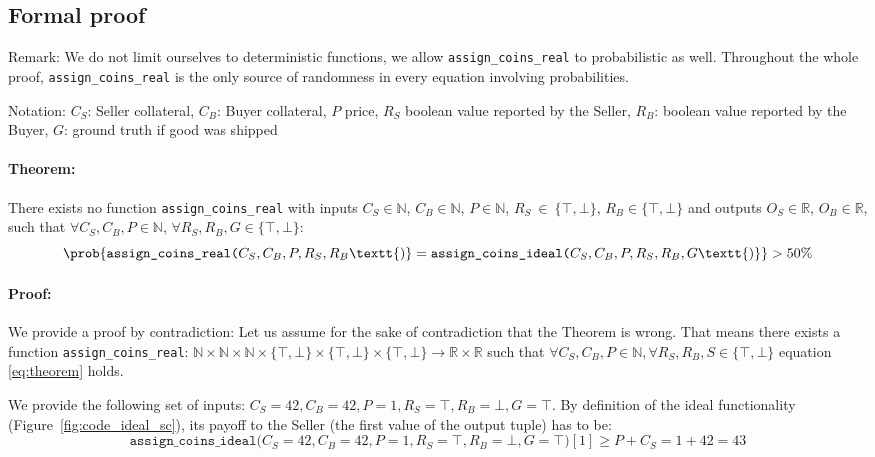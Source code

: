 \documentclass{cacthesis}
\newcommand{\authnote}[3]{{ \footnotesize \textbf{#1[#2: #3]~}}}
\newcommand{\niknote}[1]{\authnote{\color{red}}{Nikos}{#1}}
\begin{document}
\subsection{Formal proof}
Remark: We do not limit ourselves to deterministic functions, we allow \texttt{assign\_coins\_real} to probabilistic as well. Throughout the whole proof, \texttt{assign\_coins\_real} is the only source of randomness in every equation involving probabilities.\newline

Notation: $C_S$: Seller collateral, $C_B$: Buyer collateral, $P$ price, $R_S$ boolean value reported by the Seller, $R_B$: boolean value reported by the Buyer, $G$: ground truth if good was shipped

\paragraph{Theorem:}There exists no function \texttt{assign\_coins\_real} with inputs $C_S \in \mathbb{N}$, $C_B \in \mathbb{N}$, $P \in \mathbb{N}$, $R_S~\in~\{\top,\bot\}$, $R_B \in \{\top,\bot\}$ and outputs  $O_S \in \mathbb{R}$, $O_B \in \mathbb{R}$, such that
 $\forall C_S, C_B, P\in \mathbb{N}$, $\forall R_S,R_B,G \in \{\top,\bot\}$:
\begin{equation}
\label{eq:theorem}
    \prob{\texttt{assign\_coins\_real(}C_S, C_B, P, R_S, R_B\textt{)} = \texttt{assign\_coins\_ideal(}C_S, C_B, P, R_S, R_B, G\textt{)}} > 50\%
\end{equation}

\paragraph{Proof:}\label{sec:proof} 
We provide a proof by contradiction: Let us assume for the sake of contradiction that the Theorem is wrong. That means there exists a function \texttt{assign\_coins\_real}: %
$\mathbb{N}\times \mathbb{N}\times \mathbb{N}\times \{\top,\bot\}\times \{\top,\bot\}\times \{\top,\bot\} \to \mathbb{R}\times \mathbb{R}$ 
such that $\forall C_S, C_B, P\in \mathbb{N}, \forall R_S,R_B,S \in \{\top,\bot\}$ equation \ref{eq:theorem} holds.\newline

We provide the following set of inputs: $C_S=42,C_B=42,P=1,R_S=\top,R_B=\bot,G=\top$.
By definition of the ideal functionality (Figure~\ref{fig:code_ideal_sc}), its payoff to the Seller (the first value of the output tuple) has to be:
\begin{equation}
\label{eq:ideal_1}
     \texttt{assign\_coins\_ideal(}C_S=42,C_B=42,P=1,R_S=\top,R_B=\bot,G=\top\texttt{)}[1] \geq P + C_S = 1 + 42 = 43
\end{equation}
\end{document}
